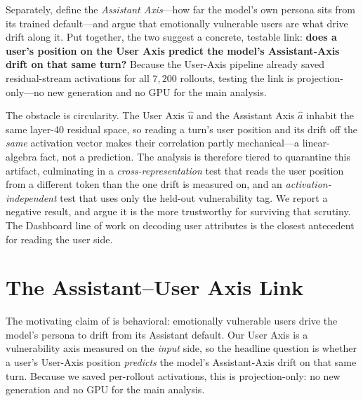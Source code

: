 \documentclass{article}
\begin{document}
Separately, \citet{lu2024assistant} define the \emph{Assistant Axis}---how far the model's own persona sits from its trained default---and argue that emotionally vulnerable users are what drive drift along it. Put together, the two suggest a concrete, testable link: \textbf{does a user's position on the User Axis predict the model's Assistant-Axis drift on that same turn?} Because the User-Axis pipeline already saved residual-stream activations for all $7{,}200$ rollouts, testing the link is projection-only---no new generation and no GPU for the main analysis.

The obstacle is circularity. The User Axis $\hat{u}$ and the Assistant Axis $\hat{a}$ inhabit the same layer-40 residual space, so reading a turn's user position and its drift off the \emph{same} activation vector makes their correlation partly mechanical---a linear-algebra fact, not a prediction. The analysis is therefore tiered to quarantine this artifact, culminating in a \emph{cross-representation} test that reads the user position from a different token than the one drift is measured on, and an \emph{activation-independent} test that uses only the held-out vulnerability tag. We report a negative result, and argue it is the more trustworthy for surviving that scrutiny. The Dashboard line of work \citep{viegas2023dashboard} on decoding user attributes is the closest antecedent for reading the user side.

\section{The Assistant--User Axis Link}\label{sec:link}
The motivating claim of \citet{lu2024assistant} is behavioral: emotionally
vulnerable users drive the model's persona to drift from its Assistant default.
Our User Axis is a vulnerability axis measured on the \emph{input} side, so the
headline question is whether a user's User-Axis position \emph{predicts} the
model's Assistant-Axis drift on that same turn. Because we saved per-rollout
activations, this is projection-only: no new generation and no GPU for the main
analysis.
\end{document}
